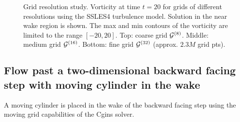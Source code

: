 {
\begin{figure}[hbt]
\newcommand{\figWidth}{11cm}
\newcommand{\trimfig}[2]{\trimFigb{#1}{#2}{0.0}{.0}{.33}{.33}}
\begin{center}\small
\caption{Grid resolution study.
Vorticity at time $t=20$ for grids of different resolutions using the SSLES4 turbulence model.
Solution in the near wake region is shown. The max and min contours of the vorticity are limited to the range $[-20,20]$.
Top: coarse grid ${\mathcal G}^{(8)}$. Middle: medium grid ${\mathcal G}^{(16)}$. Bottom: fine grid ${\mathcal G}^{(32)}$ (approx. $2.3M$ grid pts).  
}
\label{fig:backStepResolutions}
\end{center}
\end{figure}
}


\clearpage
\subsection{Flow past a two-dimensional backward facing step with moving cylinder in the wake}

A moving cylinder is placed in the wake of the backward facing step using the 
moving grid capabilities of the Cgins solver.

